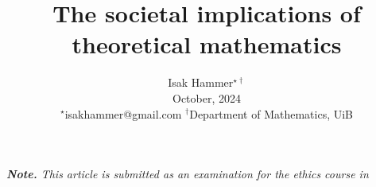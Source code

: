 \documentclass[10pt,twocolumn]{article}
\title{ {\Large \textbf{The societal implications of theoretical mathematics   }} }
\begin{document}
\author{
Isak Hammer$^{\star\dagger}$  \\
{\small  October, 2024}\\
{\footnotesize $^\star$isakhammer@gmail.com }
{\footnotesize $^\dagger$Department of Mathematics, UiB}\\
}

\maketitle
\begin{sloppy}
 \textit{ \textbf{Note.} This article is submitted as an examination for the ethics course in   \\}






\end{sloppy}
\end{document}
